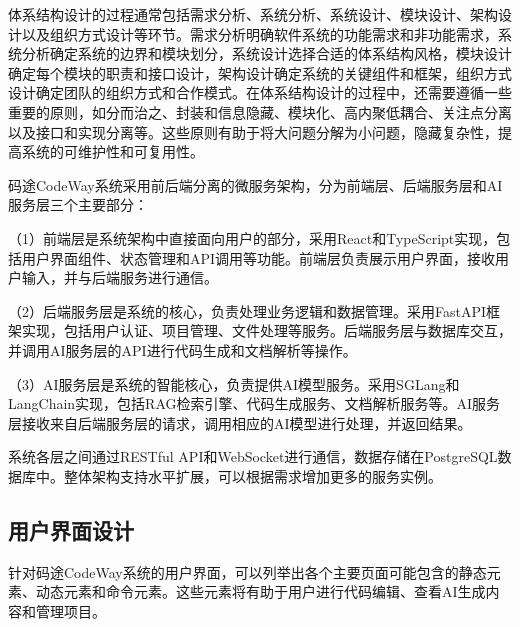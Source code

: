 \documentclass[
    report,     %
    oneside,    %
    UTF8,       %
    zihao=-4    %
]{config} %
\begin{document}
体系结构设计的过程通常包括需求分析、系统分析、系统设计、模块设计、架构设计以及组织方式设计等环节。需求分析明确软件系统的功能需求和非功能需求，系统分析确定系统的边界和模块划分，系统设计选择合适的体系结构风格，模块设计确定每个模块的职责和接口设计，架构设计确定系统的关键组件和框架，组织方式设计确定团队的组织方式和合作模式。在体系结构设计的过程中，还需要遵循一些重要的原则，如分而治之、封装和信息隐藏、模块化、高内聚低耦合、关注点分离以及接口和实现分离等。这些原则有助于将大问题分解为小问题，隐藏复杂性，提高系统的可维护性和可复用性。

码途CodeWay系统采用前后端分离的微服务架构，分为前端层、后端服务层和AI服务层三个主要部分：

（1）前端层是系统架构中直接面向用户的部分，采用React和TypeScript实现，包括用户界面组件、状态管理和API调用等功能。前端层负责展示用户界面，接收用户输入，并与后端服务进行通信。

（2）后端服务层是系统的核心，负责处理业务逻辑和数据管理。采用FastAPI框架实现，包括用户认证、项目管理、文件处理等服务。后端服务层与数据库交互，并调用AI服务层的API进行代码生成和文档解析等操作。

（3）AI服务层是系统的智能核心，负责提供AI模型服务。采用SGLang和LangChain实现，包括RAG检索引擎、代码生成服务、文档解析服务等。AI服务层接收来自后端服务层的请求，调用相应的AI模型进行处理，并返回结果。

系统各层之间通过RESTful API和WebSocket进行通信，数据存储在PostgreSQL数据库中。整体架构支持水平扩展，可以根据需求增加更多的服务实例。
\subsection{用户界面设计}

针对码途CodeWay系统的用户界面，可以列举出各个主要页面可能包含的静态元素、动态元素和命令元素。这些元素将有助于用户进行代码编辑、查看AI生成内容和管理项目。
\end{document}
